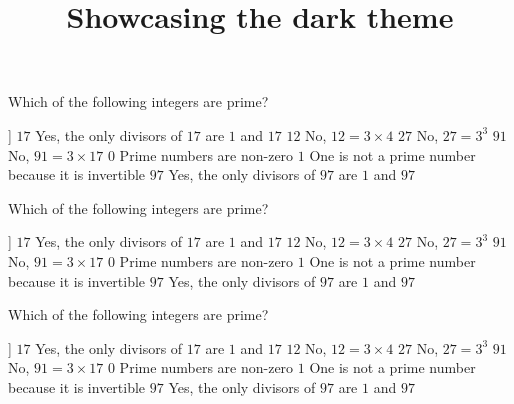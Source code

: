 \documentclass[theme=dark]{webquiz}
\title{Showcasing the dark theme}
\begin{document}
  \begin{question}     %
     Which of the following integers are prime?
     \begin{choice}[multiple, columns=3]]
       \correct   $17$ \response Yes, the only divisors of $17$ are $1$ and $17$
       \incorrect $12$ \response No, $12 = 3\times 4$
       \incorrect $27$ \response No, $27=3^3$
       \incorrect $91$ \response No, $91 = 3\times 17$
       \incorrect  $0$ \response Prime numbers are non-zero
       \incorrect  $1$ \response One is not a prime number because it is invertible
       \correct   $97$ \response Yes, the only divisors of $97$ are $1$ and $97$
     \end{choice}
  \end{question}

  \begin{question}     %
     Which of the following integers are prime?
     \begin{choice}[multiple, columns=3]]
       \correct   $17$ \response Yes, the only divisors of $17$ are $1$ and $17$
       \incorrect $12$ \response No, $12 = 3\times 4$
       \incorrect $27$ \response No, $27=3^3$
       \incorrect $91$ \response No, $91 = 3\times 17$
       \incorrect  $0$ \response Prime numbers are non-zero
       \incorrect  $1$ \response One is not a prime number because it is invertible
       \correct   $97$ \response Yes, the only divisors of $97$ are $1$ and $97$
     \end{choice}
  \end{question}

  \begin{question}     %
     Which of the following integers are prime?
     \begin{choice}[multiple, columns=3]]
       \correct   $17$ \response Yes, the only divisors of $17$ are $1$ and $17$
       \incorrect $12$ \response No, $12 = 3\times 4$
       \incorrect $27$ \response No, $27=3^3$
       \incorrect $91$ \response No, $91 = 3\times 17$
       \incorrect  $0$ \response Prime numbers are non-zero
       \incorrect  $1$ \response One is not a prime number because it is invertible
       \correct   $97$ \response Yes, the only divisors of $97$ are $1$ and $97$
     \end{choice}
  \end{question}
\end{document}
